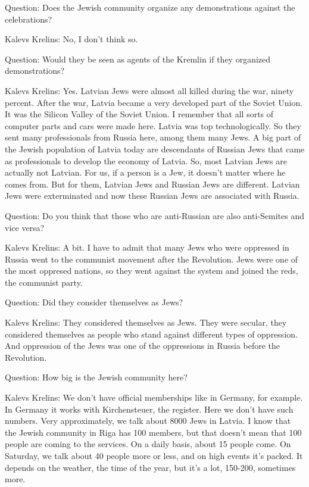Question: Does the Jewish community organize any demonstrations against the celebrations? 

Kalevs Krelins: No, I don’t think so.  

Question: Would they be seen as agents of the Kremlin if they organized demonstrations? 

Kalevs Krelins: Yes. Latvian Jews were almost all killed during the war, ninety percent. After the war, Latvia became a very developed part of the Soviet Union. It was the Silicon Valley of the Soviet Union. I remember that all sorts of computer parts and cars were made here. Latvia was top technologically. So they sent many professionals from Russia here, among them many Jews. A big part of the Jewish population of Latvia today are descendants of Russian Jews that came as professionals to develop the economy of Latvia. So, most Latvian Jews are actually not Latvian. For us, if a person is a Jew, it doesn’t matter where he comes from. But for them, Latvian Jews and Russian Jews are different. Latvian Jews were exterminated and now these Russian Jews are associated with Russia.  

Question: Do you think that those who are anti-Russian are also anti-Semites and vice versa? 

Kalevs Krelins: A bit. I have to admit that many Jews who were oppressed in Russia went to the communist movement after the Revolution. Jews were one of the most oppresed nations, so they went against the system and joined the reds, the communist party. 

Question: Did they consider themselves as Jews? 

Kalevs Krelins: They considered themselves as Jews. They were secular, they considered themselves as people who stand against different types of oppression. And oppression of the Jews was one of the oppressions in Russia before the Revolution.   

Question: How big is the Jewish community here? 

Kalevs Krelins: We don’t have official memberships like in Germany, for example. In Germany it works with Kirchensteuer, the register. Here we don’t have such numbers. Very approximately, we talk about 8000 Jews in Latvia. I know that the Jewish community in Riga has 100 members, but that doesn’t mean that 100 people are coming to the services. On a daily basis, about 15 people come. On Saturday, we talk about 40 people more or less, and on high events it’s packed. It depends on the weather, the time of the year, but it’s a lot, 150-200, sometimes more.  

